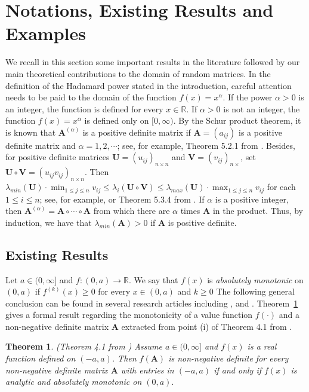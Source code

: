 \documentclass[conference,letterpaper]{IEEEtran}
\numberwithin{equation}{section}
\newcommand{\lbl}{\label}
\newtheorem{theorem}{{\sc Theorem}}
\begin{document}
\section{Notations, Existing Results and Examples}\lbl{sec:notations}
We recall in this section some important results in the literature followed by our main theoretical contributions to the domain of random matrices.
In the definition of the Hadamard power stated in the introduction, careful attention needs to be paid to the domain of the function $f(x)=x^{\alpha}$. 
If the power $\alpha>0$ is an integer, the function is defined for every $x\in \mathbb{R}.$ If $\alpha>0$ is not an integer, the function $f(x)=x^{\alpha}$ is defined only on $[0, \infty).$ By the Schur product theorem, it is known that $\mathbf{A}^{(\alpha)}$ is a positive definite matrix if $\mathbf{A}=(a_{ij})$ is a positive definite matrix and $\alpha =1,2, \cdots$; see, for example, Theorem 5.2.1 from \cite{horn_johnson_1991}. 
Besides, for positive definite matrices $\mathbf{U}=(u_{ij})_{n\times n}$ and $\mathbf{V}=(v_{ij})_{n\times}$, set $\mathbf{U}\circ \mathbf{V}=(u_{ij}v_{ij})_{n\times n}$. 
Then  $\lambda_{min}(\mathbf{U})\cdot\min_{1\leq j \leq n}{v_{ij}}\leq \lambda_i(\mathbf{U}\circ \mathbf{V})\leq \lambda_{max}(\mathbf{U})\cdot\max_{1\leq j \leq n}{v_{ij}}$ for each $1\leq i \leq n$; see, for example, \cite{schur1911bemerkungen} or Theorem 5.3.4 from \cite{horn_johnson_1991}. 
If $\alpha$ is a positive integer, then  $\mathbf{A}^{(\alpha)}=\mathbf{A}\circ\cdots\circ\mathbf{A}$ from which there are $\alpha$ times $\mathbf{A}$ in the product. Thus, by induction, we have that $\lambda_{min}(\mathbf{A})>0$ if $\mathbf{A}$ is positive definite.


\subsection{Existing Results}\lbl{known_results}

 Let $a \in (0, \infty]$ and $f: (0, a) \to \mathbb{R}$. 
 We say that $f(x)$ is {\it absolutely monotonic} on  $(0, a)$ if $f^{(k)}(x)\geq 0$ for every $x\in (0, a)$ and $k\geq0$ 
 The following general conclusion can be found in several research articles including \cite{schoenberg1988positive},  \cite{vasudeva1979positive} and \cite{hiai2009monotonicity}.
Theorem~\ref{oldth1} gives a formal result regarding the monotonicity of a value function $f(\cdot)$ and a non-negative definite matrix $\mathbf{A}$ extracted from point (i) of Theorem 4.1 from \cite{hiai2009monotonicity}.
\medskip
\begin{theorem} \label{oldth1} (Theorem 4.1 from \cite{hiai2009monotonicity})
Assume $a \in (0, \infty]$ and $f(x)$ is a real function defined on $(-a, a)$.  
Then $f(\mathbf{A})$ is non-negative definite for every non-negative definite matrix  $\mathbf{A}$ with  entries in $(-a, a)$ if and only if $f(x)$ is analytic and absolutely monotonic on $(0, a).$
\end{theorem}
\medskip
\end{document}
